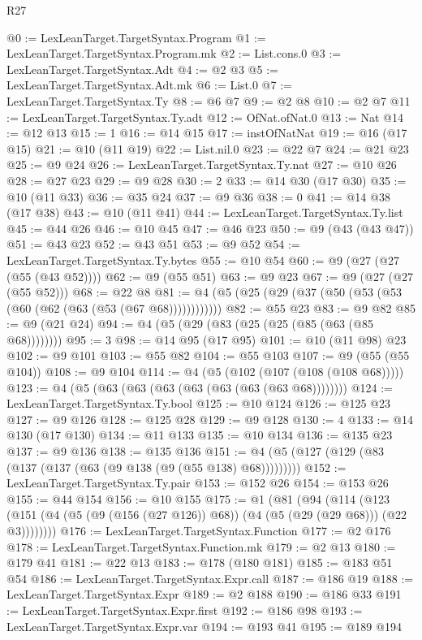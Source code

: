 \begin{lexlean}{R27}
\begin{coremodule}
@0 := LexLeanTarget.TargetSyntax.Program
@1 := LexLeanTarget.TargetSyntax.Program.mk
@2 := List.cons.{0}
@3 := LexLeanTarget.TargetSyntax.Adt
@4 := @2 @3
@5 := LexLeanTarget.TargetSyntax.Adt.mk
@6 := List.{0}
@7 := LexLeanTarget.TargetSyntax.Ty
@8 := @6 @7
@9 := @2 @8
@10 := @2 @7
@11 := LexLeanTarget.TargetSyntax.Ty.adt
@12 := OfNat.ofNat.{0}
@13 := Nat
@14 := @12 @13
@15 := 1
@16 := @14 @15
@17 := instOfNatNat
@19 := @16 (@17 @15)
@21 := @10 (@11 @19)
@22 := List.nil.{0}
@23 := @22 @7
@24 := @21 @23
@25 := @9 @24
@26 := LexLeanTarget.TargetSyntax.Ty.nat
@27 := @10 @26
@28 := @27 @23
@29 := @9 @28
@30 := 2
@33 := @14 @30 (@17 @30)
@35 := @10 (@11 @33)
@36 := @35 @24
@37 := @9 @36
@38 := 0
@41 := @14 @38 (@17 @38)
@43 := @10 (@11 @41)
@44 := LexLeanTarget.TargetSyntax.Ty.list
@45 := @44 @26
@46 := @10 @45
@47 := @46 @23
@50 := @9 (@43 (@43 @47))
@51 := @43 @23
@52 := @43 @51
@53 := @9 @52
@54 := LexLeanTarget.TargetSyntax.Ty.bytes
@55 := @10 @54
@60 := @9 (@27 (@27 (@55 (@43 @52))))
@62 := @9 (@55 @51)
@63 := @9 @23
@67 := @9 (@27 (@27 (@55 @52)))
@68 := @22 @8
@81 := @4 (@5 (@25 (@29 (@37 (@50 (@53 (@53 (@60 (@62 (@63 (@53 (@67 @68))))))))))))
@82 := @55 @23
@83 := @9 @82
@85 := @9 (@21 @24)
@94 := @4 (@5 (@29 (@83 (@25 (@25 (@85 (@63 (@85 @68))))))))
@95 := 3
@98 := @14 @95 (@17 @95)
@101 := @10 (@11 @98) @23
@102 := @9 @101
@103 := @55 @82
@104 := @55 @103
@107 := @9 (@55 (@55 @104))
@108 := @9 @104
@114 := @4 (@5 (@102 (@107 (@108 (@108 @68)))))
@123 := @4 (@5 (@63 (@63 (@63 (@63 (@63 (@63 (@63 @68))))))))
@124 := LexLeanTarget.TargetSyntax.Ty.bool
@125 := @10 @124
@126 := @125 @23
@127 := @9 @126
@128 := @125 @28
@129 := @9 @128
@130 := 4
@133 := @14 @130 (@17 @130)
@134 := @11 @133
@135 := @10 @134
@136 := @135 @23
@137 := @9 @136
@138 := @135 @136
@151 := @4 (@5 (@127 (@129 (@83 (@137 (@137 (@63 (@9 @138 (@9 (@55 @138) @68)))))))))
@152 := LexLeanTarget.TargetSyntax.Ty.pair
@153 := @152 @26
@154 := @153 @26
@155 := @44 @154
@156 := @10 @155
@175 := @1
    (@81
      (@94
        (@114
          (@123 (@151 (@4 (@5 (@9 (@156 (@27 @126)) @68)) (@4 (@5 (@29 (@29 @68))) (@22 @3))))))))
@176 := LexLeanTarget.TargetSyntax.Function
@177 := @2 @176
@178 := LexLeanTarget.TargetSyntax.Function.mk
@179 := @2 @13
@180 := @179 @41
@181 := @22 @13
@183 := @178 (@180 @181)
@185 := @183 @51 @54
@186 := LexLeanTarget.TargetSyntax.Expr.call
@187 := @186 @19
@188 := LexLeanTarget.TargetSyntax.Expr
@189 := @2 @188
@190 := @186 @33
@191 := LexLeanTarget.TargetSyntax.Expr.first
@192 := @186 @98
@193 := LexLeanTarget.TargetSyntax.Expr.var
@194 := @193 @41
@195 := @189 @194

\end{coremodule}
\end{lexlean}
